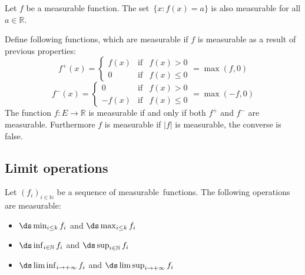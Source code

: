         \begin{property}
			Let $f$ be a measurable function. The set\footnotemark\ $\{x:f(x) = a\}$ is also measurable for all $a\in\mathbb{R}$.
		\end{property}

        \begin{theorem}
			Define following functions, which are measurable if $f$ is measurable as a result of previous properties:
            \begin{equation}
				\label{lebesgue:positive_part}
                f^+(x) = \left\{
                \begin{array}{ccc}
					f(x)&\text{if}&f(x)>0\\
                    0&\text{if}&f(x)\leq0
				\end{array}\right. = \max(f,0)
			\end{equation}
            \begin{equation}
				\label{lebesgue:negative_part}
                f^-(x) = \left\{
                \begin{array}{ccc}
					0&\text{if}&f(x)>0\\
                    -f(x)&\text{if}&f(x)\leq0
				\end{array}\right. = \max(-f,0)
			\end{equation}
            The function $f:E\rightarrow\mathbb{R}$ is measurable if and only if both $f^+$ and $f^-$ are measurable. Furthermore $f$ is measurable if $|f|$ is measurable, the converse is false.
		\end{theorem}

	\subsection{Limit operations}
    	\begin{property}
			Let $(f_i)_{i\in\mathbb{N}}$ be a sequence of measurable\footnotemark\ functions. The following operations are measurable:
            \begin{itemize}
				\item $\ds\min_{i\leq k}f_i$ and $\ds\max_{i\leq k}f_i$
                \item $\ds\inf_{i\in\mathbb{N}}f_i$ and $\ds\sup_{i\in\mathbb{N}}f_i$
                \item $\ds\liminf_{i\rightarrow+\infty}f_i$ and $\ds\limsup_{i\rightarrow+\infty}f_i$
			\end{itemize}
		\end{property}
        
